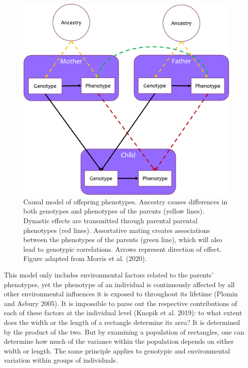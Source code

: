 \documentclass[
]{book}
\begin{document}
\begin{figure}
\includegraphics[width=1\linewidth]{figs/introduction/pheno_causal_model} \caption{Causal model of offspring phenotypes. Ancestry causes differences in both genotypes and phenotypes of the parents (yellow lines). Dynastic effects are transmitted through parental parental phenotypes (red lines). Assortative mating creates associations between the phenotypes of the parents (green line), which will also lead to genotypic correlations. Arrows represent direction of effect. Figure adapted from Morris et al. (2020).}\label{fig:pheno-causal-model}
\end{figure}

This model only includes environmental factors related to the parents' phenotypes, yet the phenotype of an individual is continuously affected by all other environmental influences it is exposed to throughout its lifetime (Plomin and Asbury 2005). It is impossible to parse out the respective contributions of each of these factors at the individual level (Knopik et al. 2019): to what extent does the width or the length of a rectangle determine its area? It is determined by the product of the two. But by examining a population of rectangles, one can determine how much of the variance within the population depends on either width or length. The same principle applies to genotypic and environmental variation within groups of individuals.
\end{document}
